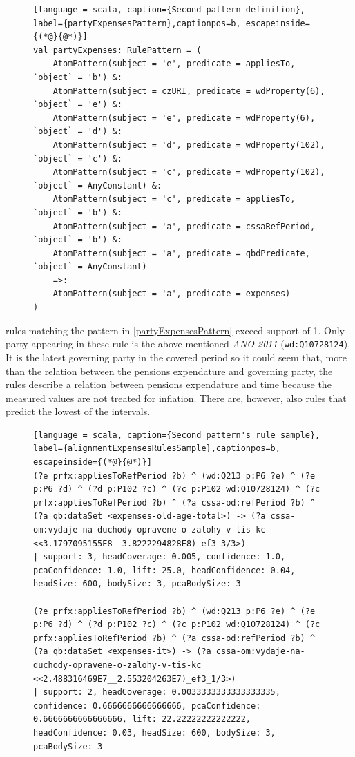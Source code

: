 \begin{figure}[h]
\begin{lstlisting}[language = scala, caption={Second pattern definition}, label={partyExpensesPattern},captionpos=b, escapeinside={(*@}{@*)}]
val partyExpenses: RulePattern = (
    AtomPattern(subject = 'e', predicate = appliesTo, `object` = 'b') &:
    AtomPattern(subject = czURI, predicate = wdProperty(6), `object` = 'e') &:
    AtomPattern(subject = 'e', predicate = wdProperty(6), `object` = 'd') &:
    AtomPattern(subject = 'd', predicate = wdProperty(102), `object` = 'c') &:  
    AtomPattern(subject = 'c', predicate = wdProperty(102), `object` = AnyConstant) &:
    AtomPattern(subject = 'c', predicate = appliesTo, `object` = 'b') &:
    AtomPattern(subject = 'a', predicate = cssaRefPeriod, `object` = 'b') &:
    AtomPattern(subject = 'a', predicate = qbdPredicate, `object` = AnyConstant)
    =>:
    AtomPattern(subject = 'a', predicate = expenses)
)
\end{lstlisting}
\end{figure}

 rules matching the pattern in \ref{partyExpensesPattern} exceed support of 1. Only party appearing in these rule is the above mentioned \textit{ANO 2011} (\verb|wd:Q10728124|). It is the latest governing party in the covered period so it could seem that, more than the relation between the pensions expendature and governing party, the rules describe a relation between pensions expendature and time because the measured values are not treated for inflation. There are, however, also rules that predict the lowest of the intervals.

\begin{figure}[h]
\begin{lstlisting}[language = scala, caption={Second pattern's rule sample}, label={alignmentExpensesRulesSample},captionpos=b, escapeinside={(*@}{@*)}]
(?e prfx:appliesToRefPeriod ?b) ^ (wd:Q213 p:P6 ?e) ^ (?e p:P6 ?d) ^ (?d p:P102 ?c) ^ (?c p:P102 wd:Q10728124) ^ (?c prfx:appliesToRefPeriod ?b) ^ (?a cssa-od:refPeriod ?b) ^ (?a qb:dataSet <expenses-old-age-total>) -> (?a cssa-om:vydaje-na-duchody-opravene-o-zalohy-v-tis-kc <<3.1797095155E8__3.8222294828E8)_ef3_3/3>) 
| support: 3, headCoverage: 0.005, confidence: 1.0, pcaConfidence: 1.0, lift: 25.0, headConfidence: 0.04, headSize: 600, bodySize: 3, pcaBodySize: 3

(?e prfx:appliesToRefPeriod ?b) ^ (wd:Q213 p:P6 ?e) ^ (?e p:P6 ?d) ^ (?d p:P102 ?c) ^ (?c p:P102 wd:Q10728124) ^ (?c prfx:appliesToRefPeriod ?b) ^ (?a cssa-od:refPeriod ?b) ^ (?a qb:dataSet <expenses-it>) -> (?a cssa-om:vydaje-na-duchody-opravene-o-zalohy-v-tis-kc <<2.488316469E7__2.553204263E7)_ef3_1/3>) 
| support: 2, headCoverage: 0.0033333333333333335, confidence: 0.6666666666666666, pcaConfidence: 0.6666666666666666, lift: 22.22222222222222, headConfidence: 0.03, headSize: 600, bodySize: 3, pcaBodySize: 3
\end{lstlisting}
\end{figure}

